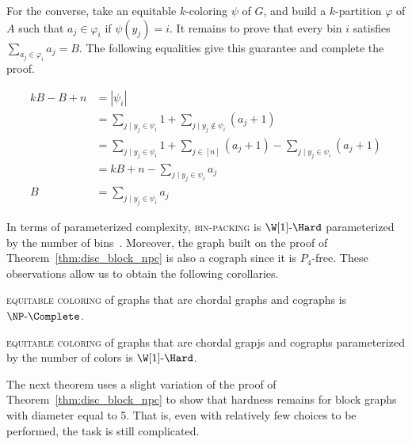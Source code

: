 \begin{tproof}
    
    For the converse, take an equitable $k$-coloring $\psi$ of $G$, and build a $k$-partition $\varphi$ of $A$ such that $a_j \in \varphi_i$ if $\psi(y_j) = i$.
    It remains to prove that every bin $i$ satisfies $\sum_{a_j \in \varphi_i} a_j = B$.
    The following equalities give this guarantee and complete the proof.
    
    \begin{align*}
        kB - B + n &= |\psi_i|\\
                   &= \sum_{j \mid y_j \in \psi_i} 1 + \sum_{j \mid y_j \notin \psi_i} (a_j + 1)\\
                   &= \sum_{j \mid y_j \in \psi_i} 1 + \sum_{j \in [n]} (a_j + 1) - \sum_{j \mid y_j \in \psi_i} (a_j + 1) \\
                   &= kB + n - \sum_{j \mid y_j \in \psi_i} a_j\\
            B      &= \sum_{j \mid y_j \in \psi_i} a_j
    \end{align*}
\end{tproof}

In terms of parameterized complexity, \textsc{bin-packing} is $\W[1]\text{-}\Hard$ parameterized by the number of bins~\citep{bin_packing_w1}.
Moreover, the graph built on the proof of Theorem~\ref{thm:disc_block_npc} is also a cograph since it is $P_4$-free.
These observations allow us to obtain the following corollaries.

\begin{corollary}
    \textsc{equitable coloring} of graphs that are chordal graphs and cographs is $\NPc$.
\end{corollary}

\begin{corollary}
    \textsc{equitable coloring} of graphs that are chordal grapjs and cographs parameterized by the number of colors is $\W[1]\text{-}\Hard$.
\end{corollary}

The next theorem uses a slight variation of the proof of Theorem~\ref{thm:disc_block_npc} to show that hardness remains for block graphs with diameter equal to 5.
That is, even with relatively few choices to be performed, the task is still complicated.

